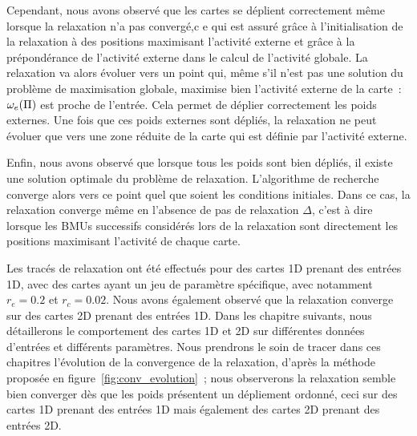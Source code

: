 \documentclass[../main]{subfiles}
\begin{document}
Cependant, nous avons observé que les cartes se déplient correctement même lorsque la relaxation n'a pas convergé,c e qui est assuré grâce à l'initialisation de la relaxation à des positions maximisant l'activité externe et grâce à la prépondérance de l'activité externe dans le calcul de l'activité globale. 
La relaxation va alors évoluer vers un point qui, même s'il n'est pas une solution du problème de maximisation globale, maximise bien l'activité externe de la carte~: $\omega_e(\Pi)$ est proche de l'entrée. Cela permet de déplier correctement les poids externes. Une fois que ces poids externes sont dépliés, la relaxation ne peut évoluer que vers une zone réduite de la carte qui est définie par l'activité externe.

Enfin, nous avons observé que lorsque tous les poids sont bien dépliés, il existe une solution optimale du problème de relaxation. L'algorithme de recherche converge alors vers ce point quel que soient les conditions initiales.
Dans ce cas, la relaxation converge même en l'absence de pas de relaxation $\Delta$, c'est à dire lorsque les BMUs successifs considérés lors de la relaxation sont directement les positions maximisant l'activité de chaque carte.

Les tracés de relaxation ont été effectués pour des cartes 1D prenant des entrées 1D, avec des cartes ayant un jeu de paramètre spécifique, avec notamment $r_e = 0.2$ et $r_c = 0.02$. 
Nous avons également observé que la relaxation converge sur des cartes 2D prenant des entrées 1D.
Dans les chapitre suivants, nous détaillerons le comportement des cartes 1D et 2D sur différentes données d'entrées et différents paramètres. Nous prendrons le soin de tracer dans ces chapitres l'évolution de la convergence de la relaxation, d'après la méthode proposée en figure~\ref{fig:conv_evolution}~; nous observerons la relaxation semble bien converger dès que les poids présentent un \og dépliement \fg{} ordonné, ceci sur des cartes 1D prenant des entrées 1D mais également des cartes 2D prenant des entrées 2D.


\ifSubfilesClassLoaded{
    \printbibliography
}{}
\end{document}
